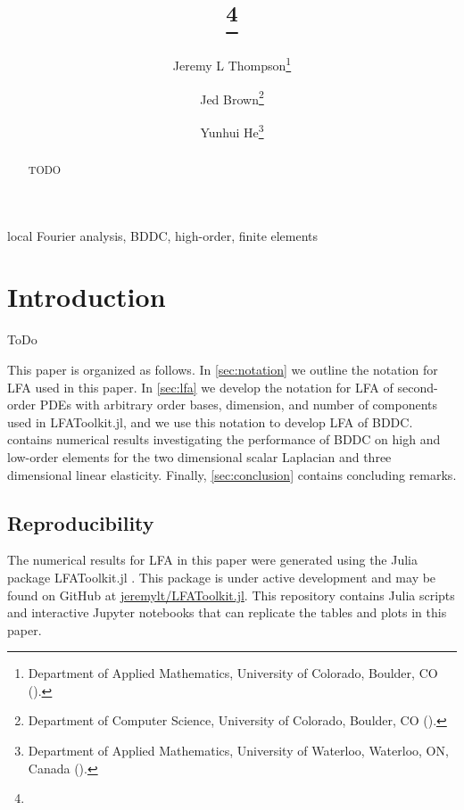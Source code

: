 \documentclass[review]{siamart190516}
\author{
  Jeremy L Thompson\thanks{Department of Applied Mathematics, University of Colorado, Boulder, CO
    (\email{jeremy@jeremylt.org}).}
  \and Jed Brown\thanks{Department of Computer Science, University of Colorado, Boulder, CO
    (\email{jed@jedbrown.org}).}
  \and Yunhui He\thanks{Department of Applied Mathematics, University of Waterloo, Waterloo, ON, Canada
    (\email{yunhui.he@uwaterloo.ca}).}
}
\title{{\TheTitle}\thanks{\TheFunding}}
\begin{document}
\maketitle

\vspace{1cm}

\begin{abstract}
TODO
\end{abstract}

\begin{keywords}
  local Fourier analysis, BDDC, high-order, finite elements
\end{keywords}

\section{Introduction}\label{sec:intro}

ToDo

This paper is organized as follows.
In \cref{sec:notation} we outline the notation for LFA used in this paper.
In \cref{sec:lfa} we develop the notation for LFA of second-order PDEs with arbitrary order bases, dimension, and number of components used in LFAToolkit.jl, and we use this notation to develop LFA of BDDC.
 contains numerical results investigating the performance of BDDC on high and low-order elements for the two dimensional scalar Laplacian and three dimensional linear elasticity.
Finally, \cref{sec:conclusion} contains concluding remarks.

\subsection{Reproducibility}\label{sec:reproducibility}

The numerical results for LFA in this paper were generated using the Julia package LFAToolkit.jl \cite{thompson2021toolkit}.
This package is under active development and may be found on GitHub at \href{https://github.com/jeremylt/LFAToolkit.jl}{jeremylt/LFAToolkit.jl}.
This repository contains Julia scripts and interactive Jupyter notebooks that can replicate the tables and plots in this paper.
\end{document}
